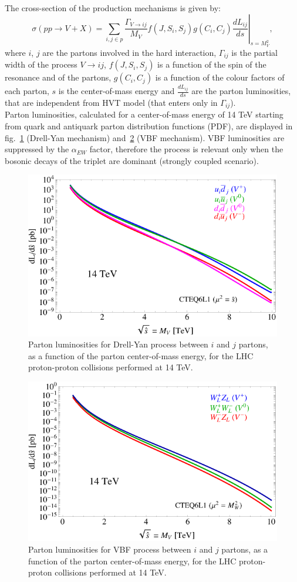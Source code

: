 The cross-section of the production mechanisms is given by:
\begin{equation}
\sigma (pp \rightarrow V + X) = \left. \sum_{i, j \in p} \frac{\Gamma_{V \rightarrow ij}}{M_V} f(J, S_i, S_j) g(C_i, C_j) \frac{dL_{ij}}{ds} \right|_{s = M_V^2},
\label{eq:prod_xsec}
\end{equation}
where $i$, $j$ are the partons involved in the hard interaction, $\Gamma_{ij}$ is the partial width of the process $V \rightarrow ij$, $f(J, S_i, S_j)$ is a function of the spin of the resonance and of the partons, $g(C_i, C_j)$ is a function of the colour factors of each parton, $s$ is the center-of-mass energy and $\frac{dL_{ij}}{ds}$ are the parton luminosities, that are independent from HVT model (that enters only in $\Gamma_{ij}$).
\\
Parton luminosities, calculated for a center-of-mass energy of 14 TeV starting from quark and antiquark parton distribution functions (PDF), are displayed in fig.~\ref{fig:HVT_DY_partolumi} (Drell-Yan mechanism) and~\ref{fig:HVT_VBF_partolumi} (VBF mechanism). VBF luminosities are suppressed by the $\alpha_{EW}$ factor, therefore the process is relevant only when the bosonic decays of the triplet are dominant (strongly coupled scenario). 
\begin{figure}[!htb]
  \centering
    \includegraphics[width=.495\textwidth]{figures/Figures_LumiDY14.png}
  \caption{Parton luminosities for Drell-Yan process between $i$ and $j$ partons, as a function of the parton center-of-mass energy, for the LHC proton-proton collisions performed at 14 TeV.}
  \label{fig:HVT_DY_partolumi}
\end{figure}

\begin{figure}[!htb]
  \centering
    \includegraphics[width=.495\textwidth]{figures/Figures_LumiVBF14.png}
  \caption{Parton luminosities for VBF process between $i$ and $j$ partons, as a function of the parton center-of-mass energy, for the LHC proton-proton collisions performed at 14 TeV.}
  \label{fig:HVT_VBF_partolumi}
\end{figure}

